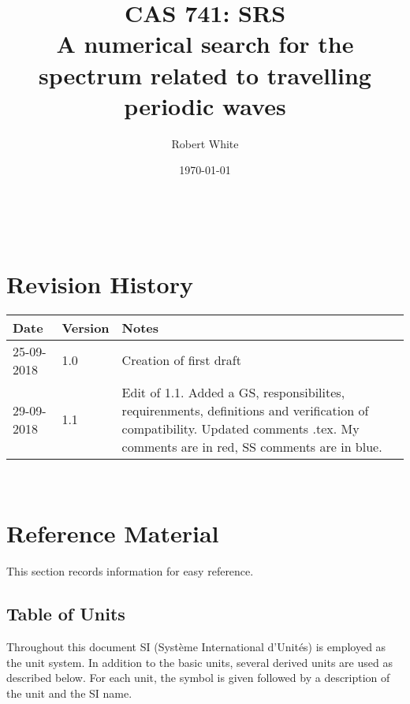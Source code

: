 \documentclass[12pt]{article}
\begin{document}
\title{CAS 741: SRS \\A numerical search for the spectrum related to travelling 
periodic waves} 
\author{Robert White}
\date{\today}
	
\maketitle

~\newpage


\section{Revision History}

\begin{tabularx}{\textwidth}{p{3cm}p{2cm}X}
\toprule {\bf Date} & {\bf Version} & {\bf Notes}\\
\midrule
25-09-2018 & 1.0 & Creation of first draft\\
29-09-2018 & 1.1 & Edit of 1.1. Added a GS, responsibilites, requirenments, 
definitions and verification of compatibility. Updated comments .tex. My 
comments are in red, SS comments are in blue.\\
\bottomrule
\end{tabularx}

~\newpage

\section{Reference Material}

This section records information for easy reference.

\subsection{Table of Units}

Throughout this document SI (Syst\`{e}me International d'Unit\'{e}s) is employed
as the unit system.  In addition to the basic units, several derived units are
used as described below.  For each unit, the symbol is given followed by a
description of the unit and the SI name. \\
 
~\newline
\end{document}
